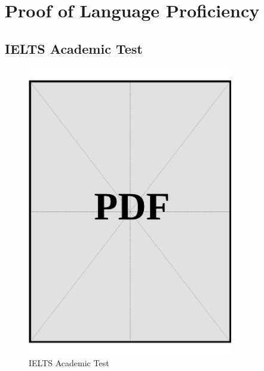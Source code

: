 \chapter{Proof of Language Proficiency}\label{sec:proof-of-language-proficiency}

\section{IELTS Academic Test}\label{sec:ielts}

\begin{figure}[ht]
  \centering
  \includegraphics[page=1, width=0.8\textwidth]{../application-docs/applicant/language-proficiency/english/ielts.pdf}
  \caption{IELTS Academic Test}
  \label{pdf:ielts-page1}
\end{figure}

\clearpage



